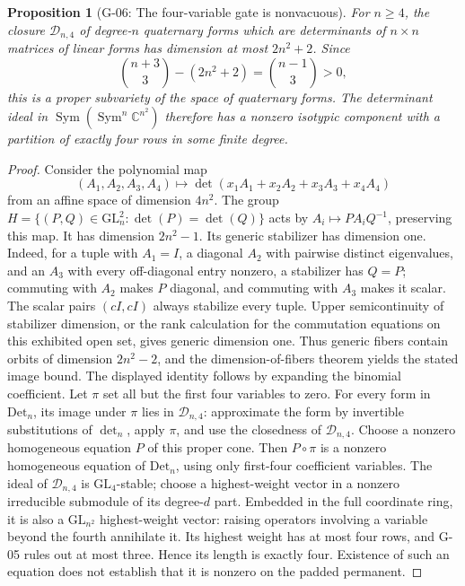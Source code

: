 \documentclass[11pt,a4paper]{article}
\newtheorem{proposition}{Proposition}
\theoremstyle{definition}\newtheorem{definition}{Definition}
\begin{document}
\begin{proposition}[G-06: The four-variable gate is nonvacuous]\label{G-06}
For $n\geq4$, the closure $\mathcal D_{n,4}$ of degree-$n$ quaternary forms which are determinants of $n\times n$ matrices of linear forms has dimension at most $2n^2+2$. Since
\[
 \binom{n+3}{3}-(2n^2+2)=\binom{n-1}{3}>0,
\]
this is a proper subvariety of the space of quaternary forms. The determinant ideal in $\operatorname{Sym}(\operatorname{Sym}^n\mathbb C^{n^2})$ therefore has a nonzero isotypic component with a partition of exactly four rows in some finite degree.
\end{proposition}
\begin{proof}
Consider the polynomial map
\[
 (A_1,A_2,A_3,A_4)\longmapsto\det(x_1A_1+x_2A_2+x_3A_3+x_4A_4)
\]
from an affine space of dimension $4n^2$. The group
$H=\{(P,Q)\in\mathrm{GL}_n^2:\det(P)=\det(Q)\}$ acts by $A_i\mapsto PA_iQ^{-1}$, preserving this map. It has dimension $2n^2-1$. Its generic stabilizer has dimension one. Indeed, for a tuple with $A_1=I$, a diagonal $A_2$ with pairwise distinct eigenvalues, and an $A_3$ with every off-diagonal entry nonzero, a stabilizer has $Q=P$; commuting with $A_2$ makes $P$ diagonal, and commuting with $A_3$ makes it scalar. The scalar pairs $(cI,cI)$ always stabilize every tuple. Upper semicontinuity of stabilizer dimension, or the rank calculation for the commutation equations on this exhibited open set, gives generic dimension one. Thus generic fibers contain orbits of dimension $2n^2-2$, and the dimension-of-fibers theorem yields the stated image bound. The displayed identity follows by expanding the binomial coefficient.
Let $\pi$ set all but the first four variables to zero. For every form in $\mathrm{Det}_n$, its image under $\pi$ lies in $\mathcal D_{n,4}$: approximate the form by invertible substitutions of $\det_n$, apply $\pi$, and use the closedness of $\mathcal D_{n,4}$. Choose a nonzero homogeneous equation $P$ of this proper cone. Then $P\circ\pi$ is a nonzero homogeneous equation of $\mathrm{Det}_n$, using only first-four coefficient variables. The ideal of $\mathcal D_{n,4}$ is $\mathrm{GL}_4$-stable; choose a highest-weight vector in a nonzero irreducible submodule of its degree-$d$ part. Embedded in the full coordinate ring, it is also a $\mathrm{GL}_{n^2}$ highest-weight vector: raising operators involving a variable beyond the fourth annihilate it. Its highest weight has at most four rows, and G-05 rules out at most three. Hence its length is exactly four. Existence of such an equation does not establish that it is nonzero on the padded permanent.
\end{proof}
\end{document}
